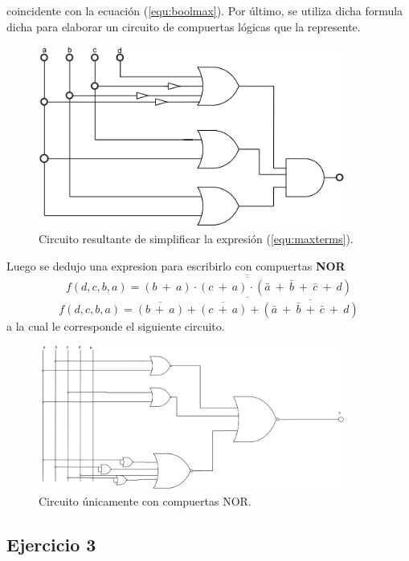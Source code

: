 \documentclass[a4paper]{article}
\begin{document}
coincidente con la ecuación	(\ref{equ:boolmax}). Por último, se utiliza dicha formula dicha para elaborar un circuito de compuertas lógicas que la represente.

\begin{figure}[H]
	\centering
	\includegraphics[width=0.9\textwidth]{Circuito2.PNG}
\caption{Circuito resultante de simplificar la expresión (\ref{equ:maxterms}).}
	\label{fig:circ2}
\end{figure}
Luego se dedujo una expresion para escribirlo con compuertas \textbf{NOR}
\[
	f \left( d,c,b,a \right) = \overline{\overline{\left( b \ + \ a \right) \cdot \left( c \ + \ a \right) \cdot \left( \bar{a} \ + \ \bar{b} \ + \ \bar{c} \ + \ d \right)}}
\]
\[
	f \left( d,c,b,a \right) = \overline{\overline{\left( b \ + \ a \right)} + \overline{\left( c \ + \ a \right)} + \overline{\left( \bar{a} \ + \ \bar{b} \ + \ \bar{c} \ + \ d \right)}}
\]
a la cual le corresponde el siguiente circuito.

\begin{figure}[H]
	\centering
	\includegraphics[width=0.9\textwidth]{Circuito5.PNG}
\caption{Circuito únicamente con compuertas NOR.}
	\label{fig:circ5}
\end{figure}
\subsection*{Ejercicio 3}
\end{document}
